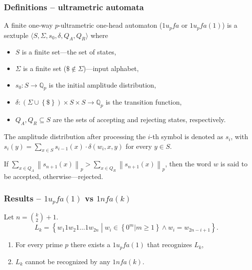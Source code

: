\documentclass{beamer}
\begin{document}
\begin{frame}
\frametitle{Definitions -- ultrametric automata}
A finite one-way $p$-ultrametric one-head automaton  ($1\mathit{u_pfa}$ or $1\mathit{u_pfa}(1)$) is a sextuple
$\langle S, \Sigma, s_0, \delta, Q_A, Q_R \rangle$ where
\begin{itemize}
  \item $S$ is a finite set---the set of states,
  \item $\Sigma$ is a finite set ($\$ \notin \Sigma$)---input alphabet,
  \item $s_0:S \rightarrow \mathbb{Q}_p$ is the initial amplitude distribution,
  \item $\delta: \left( \Sigma \cup \left\{ \$ \right\} \right) \times S \times S \rightarrow \mathbb{Q}_p$ is the transition function,
  \item $Q_A, Q_R \subseteq S$ are the sets of accepting and rejecting states, respectively.
\end{itemize}

The amplitude distribution after processing the $i$-th symbol is denoted as $s_i$, with
$s_i(y) = \sum_{x \in S}{s_{i-1}(x) \cdot \delta \left( w_i, x, y \right) }$ for every $y \in S$.

If $\sum_{x \in Q_A}{\left\| s_{n+1}(x) \right\|_p} > \sum_{x \in Q_R}{\left\| s_{n+1}(x) \right\|_p}$, then the word $w$ is said to be accepted, otherwise---rejected.

\end{frame}
\begin{frame}
\frametitle{Results -- $1\mathit{u_pfa}(1)$ vs $1\mathit{nfa}(k)$}
Let $n={k\choose 2}+1$.
\[
L_k = \left\{ w_1 1 w_2 1 \ldots 1 w_{2n} \middle|
		w_i \in \left\{ 0^m | m \geq 1 \right\} \wedge
		w_i = w_{2n-i+1} 
		 \right\}.
\]

\begin{enumerate}
	\item For every prime $p$ there exists a $1\mathit{u_pfa}(1)$ that recognizes $L_k$,
	\item $L_k$ cannot be recognized by any $1\mathit{nfa}(k)$.
\end{enumerate}
\end{frame}
\end{document}
